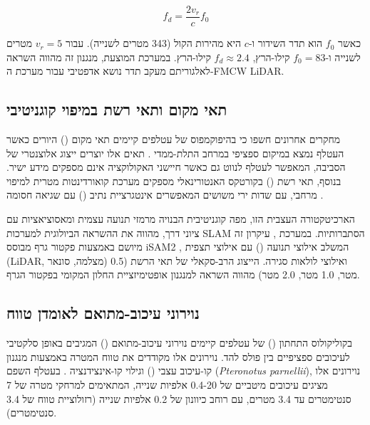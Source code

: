 \begin{equation}
f_d = \frac{2 v_r}{c} f_0
\label{eq:ch02_doppler_shift}
\end{equation}

כאשר $f_0$ הוא תדר השידור ו-$c$ היא מהירות הקול (343 מטרים לשנייה). עבור $v_r = 5$ מטרים לשנייה ו-$f_0 = 83$ קילו-הרץ, $f_d \approx 2.4$ קילו-הרץ. במערכת המוצעת, מנגנון זה מהווה השראה לאלגוריתם מעקב תדר נושא אדפטיבי עבור מערכת ה-FMCW LiDAR.

\subsection{תאי מקום ותאי רשת במיפוי קוגניטיבי}
\label{sec:ch02_place_cells}

מחקרים אחרונים חשפו כי בהיפוקמפוס של עטלפים קיימים תאי מקום () היורים כאשר העטלף נמצא במיקום ספציפי במרחב התלת-ממדי \cite{MossEcholocation}. תאים אלו יוצרים ייצוג אלוצנטרי של הסביבה, המאפשר לעטלף לנווט גם כאשר חיישני האקולוקציה אינם מספקים מידע ישיר. בנוסף, תאי רשת () בקורטקס האנטורינאלי מספקים מערכת קואורדינטות מטרית למיפוי מרחבי, עם שדות ירי משושים המאפשרים אינטגרציית נתיב () עם שגיאה חסומה \cite{MossEcholocation}.

הארכיטקטורה העצבית הזו, מפה קוגניטיבית הבנויה מרמזי תנועה עצמית ומאסוציאציות עם ציוני דרך, מהווה את ההשראה הביולוגית למערכות SLAM הסתברותיות. במערכת , עיקרון זה מיושם באמצעות פקטור גרף מבוסס iSAM2 \cite{Kaess2012iSAM2}, המשלב אילוצי תנועה () עם אילוצי תצפית (LiDAR, מצלמה, סונאר) ואילוצי לולאות סגירה. הייצוג הרב-סקאלי של תאי הרשת (0.5 מטר, 1.0 מטר, 2.0 מטר) מהווה השראה למנגנון אופטימיזציית החלון המקומי בפקטור הגרף.

\subsection{נוירוני עיכוב-מתואם לאומדן טווח}
\label{sec:ch02_delay_tuned}

בקוליקולוס התחתון () של עטלפים קיימים נוירוני עיכוב-מתואם () המגיבים באופן סלקטיבי לעיכובים ספציפיים בין פולס להד. נוירונים אלו מקודדים את טווח המטרה באמצעות מנגנון קו-עיכוב עצבי () וגילוי קו-אינצידנציה \cite{GriffinBatEcholocation}. בעטלף השפם (\textit{Pteronotus parnellii}), נוירונים אלו מציגים עיכובים מיטביים של 0.4-20 אלפיות שנייה, המתאימים למרחקי מטרה של 7 סנטימטרים עד 3.4 מטרים, עם רוחב כיוונון של 0.2 אלפיות שנייה (רזולוציית טווח של 3.4 סנטימטרים).

